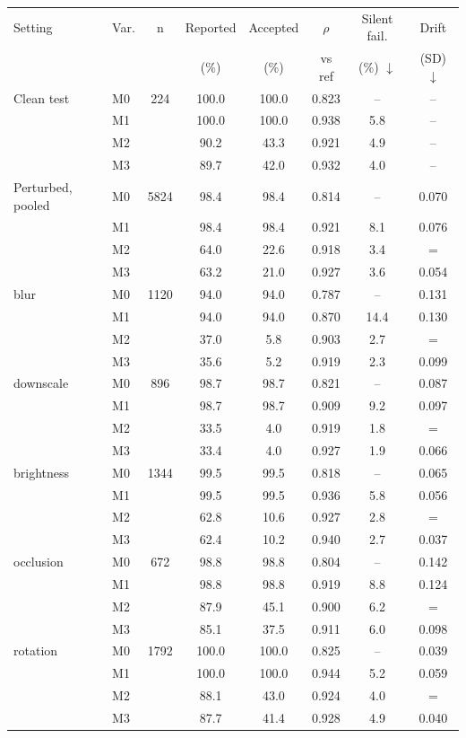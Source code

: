 \begin{tabular}{@{}llcccccc@{}}
\toprule
Setting & Var. & n & Reported & Accepted & $\rho$ & Silent fail. & Drift\\
 & & & (\%) & (\%) & vs ref & (\%) $\downarrow$ & (SD) $\downarrow$\\
\midrule
Clean test & M0 & 224 & 100.0 & 100.0 & 0.823 & -- & --\\
 & M1 &  & 100.0 & 100.0 & 0.938 & 5.8 & --\\
 & M2 &  & 90.2 & 43.3 & 0.921 & 4.9 & --\\
 & M3 &  & 89.7 & 42.0 & 0.932 & 4.0 & --\\
\midrule
Perturbed, pooled & M0 & 5824 & 98.4 & 98.4 & 0.814 & -- & 0.070\\
 & M1 &  & 98.4 & 98.4 & 0.921 & 8.1 & 0.076\\
 & M2 &  & 64.0 & 22.6 & 0.918 & 3.4 & =\\
 & M3 &  & 63.2 & 21.0 & 0.927 & 3.6 & 0.054\\
\midrule
\quad blur & M0 & 1120 & 94.0 & 94.0 & 0.787 & -- & 0.131\\
 & M1 &  & 94.0 & 94.0 & 0.870 & 14.4 & 0.130\\
 & M2 &  & 37.0 & 5.8 & 0.903 & 2.7 & =\\
 & M3 &  & 35.6 & 5.2 & 0.919 & 2.3 & 0.099\\
\midrule
\quad downscale & M0 & 896 & 98.7 & 98.7 & 0.821 & -- & 0.087\\
 & M1 &  & 98.7 & 98.7 & 0.909 & 9.2 & 0.097\\
 & M2 &  & 33.5 & 4.0 & 0.919 & 1.8 & =\\
 & M3 &  & 33.4 & 4.0 & 0.927 & 1.9 & 0.066\\
\midrule
\quad brightness & M0 & 1344 & 99.5 & 99.5 & 0.818 & -- & 0.065\\
 & M1 &  & 99.5 & 99.5 & 0.936 & 5.8 & 0.056\\
 & M2 &  & 62.8 & 10.6 & 0.927 & 2.8 & =\\
 & M3 &  & 62.4 & 10.2 & 0.940 & 2.7 & 0.037\\
\midrule
\quad occlusion & M0 & 672 & 98.8 & 98.8 & 0.804 & -- & 0.142\\
 & M1 &  & 98.8 & 98.8 & 0.919 & 8.8 & 0.124\\
 & M2 &  & 87.9 & 45.1 & 0.900 & 6.2 & =\\
 & M3 &  & 85.1 & 37.5 & 0.911 & 6.0 & 0.098\\
\midrule
\quad rotation & M0 & 1792 & 100.0 & 100.0 & 0.825 & -- & 0.039\\
 & M1 &  & 100.0 & 100.0 & 0.944 & 5.2 & 0.059\\
 & M2 &  & 88.1 & 43.0 & 0.924 & 4.0 & =\\
 & M3 &  & 87.7 & 41.4 & 0.928 & 4.9 & 0.040\\
\bottomrule
\end{tabular}
